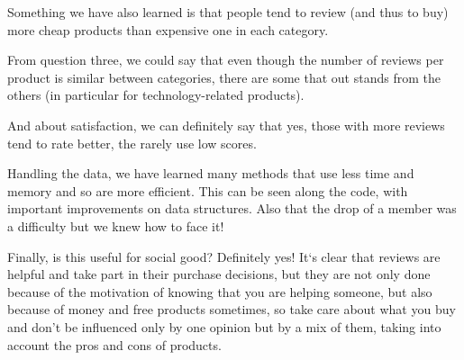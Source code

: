 \documentclass[11pt]{article}
\begin{document}
Something we have also learned is that people tend to review (and thus to buy) more cheap products than expensive one in each category.

From question three, we could say that even though the number of reviews per product is similar between categories, there are some that out stands from the others (in particular for technology-related products).

And about satisfaction, we can definitely say that yes, those with more reviews tend to rate better, the rarely use low scores.

Handling the data, we have learned many methods that use less time and memory and so are more efficient. This can be seen along the code, with important improvements on data structures. Also that the drop of a member was a difficulty but we knew how to face it!

Finally, is this useful for social good? Definitely yes! It`s clear that reviews are helpful and take part in their purchase decisions, but they are not only done because of the motivation of knowing that you are helping someone, but also because of money and free products sometimes, so take care about what you buy and don't be influenced only by one opinion but by a mix of them, taking into account the pros and cons of products.

\end{document}
